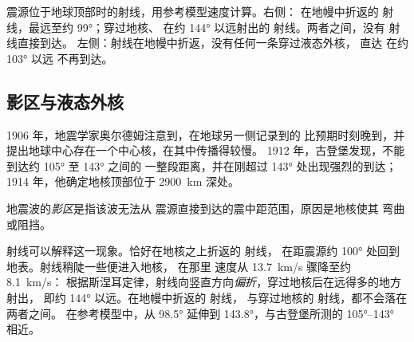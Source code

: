 \begin{omfigure}
{\small 震源位于地球顶部时的射线，用参考模型速度计算。右侧：
在地幔中折返的 射线，最远至约 \ang{99}；穿过地核、
在约 \ang{144} 以远射出的 射线。两者之间，没有 射线直接到达。
左侧：射线在地幔中折返，没有任何一条穿过液态外核，
直达 在约 \ang{103} 以远
不再到达。}
\end{omfigure}

\subsection{影区与液态外核}

1906 年，地震学家奥尔德姆注意到，在地球另一侧记录到的 
比预期时刻晚到，并提出地球中心存在一个中心核，在其中传播得较慢。
1912 年，古登堡发现，不能到达约 \ang{105} 至 \ang{143} 之间的
一整段距离，并在刚超过 \ang{143} 处出现强烈的到达；
1914 年，他确定地核顶部位于
\qty{2900}{km} 深处。

\begin{definition}[影区]\label{def:g11:seismic-structure:shadow-zone}
地震波的\emph{影区}是指该波无法从
震源直接到达的震中距范围，原因是地核使其
弯曲或阻挡。
\end{definition}

射线可以解释这一现象。恰好在地核之上折返的 射线，
在距震源约 \ang{100} 处回到地表。射线稍陡一些便进入地核，
在那里 速度从 \qty{13.7}{km/s} 骤降至约 \qty{8.1}{km/s}：
根据斯涅耳定律，射线向竖直方向\emph{偏折}，穿过地核后在远得多的地方射出，
即约 \ang{144} 以远。在地幔中折返的 射线，
与穿过地核的 射线，都不会落在两者之间。
在参考模型中，从 \ang{98.5} 延伸到
\ang{143.8}，与古登堡所测的 \ang{105}--\ang{143} 相近。

